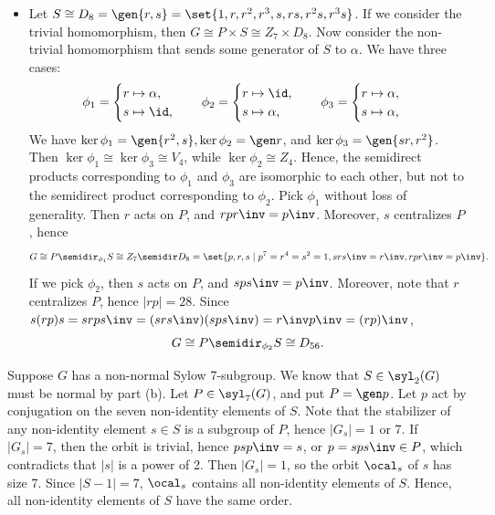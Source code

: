 \begin{solenum}[spsol]
\begin{itemize}
\[        \]
        Note that non-triviality of the homomorphism implies that some $s \in S$ does not centralize $P$.
        If $G$ could be written as a direct product, then $S$ would centralize $P$, which is a contradiction.
        Hence, $G$ is not a direct product.
        \item Let $S \cong D_8 = \gen{r, s} = \set{1, r, r^2, r^3, s, rs, r^2s, r^3s}$.
        If we consider the trivial homomorphism, then $G \cong P \times S \cong Z_7 \times D_8$.
        Now consider the non-trivial homomorphism that sends some generator of $S$ to $\alpha$.
        We have three cases:
        \[
        	\phi_1 = 
            \begin{cases}
                r \mapsto \alpha, \\
                s \mapsto \id,
            \end{cases} \quad
            \phi_2 =
            \begin{cases}
                r \mapsto \id, \\
                s \mapsto \alpha,
            \end{cases} \quad
            \phi_3 =
            \begin{cases}
                r \mapsto \alpha, \\
                s \mapsto \alpha,
            \end{cases}
        \]
        We have $\ker\phi_1 = \gen{r^2, s}, \ker\phi_2 = \gen r$, and $\ker\phi_3 = \gen{sr, r^2}$.
        Then $\ker\phi_1 \cong \ker\phi_3 \cong V_4$, while $\ker\phi_2 \cong Z_4$.
        Hence, the semidirect products corresponding to $\phi_1$ and $\phi_3$ are isomorphic to each other, but not to the semidirect product corresponding to $\phi_2$.
        Pick $\phi_1$ without loss of generality.
        Then $r$ acts on $P$, and $rpr\inv = p\inv$.
        Moreover, $s$ centralizes $P$, hence
        \[
        	G \cong P \semidir_{\phi_1} S \cong Z_7 \semidir D_8 = \set{p, r, s \mid p^7 = r^4 = s^2 = 1, srs\inv = r\inv, rpr\inv = p\inv}.
        \]
        If we pick $\phi_2$, then $s$ acts on $P$, and $sps\inv = p\inv$.
        Moreover, note that $r$ centralizes $P$, hence $|rp| = 28$.
        Since $s(rp)s = srps\inv = (srs\inv)(sps\inv) = r\inv p\inv = (rp)\inv$,
        \[
        	G \cong P \semidir_{\phi_2} S \cong D_{56}.
        \]
    \end{itemize}
    \item Suppose $G$ has a non-normal Sylow 7-subgroup.
	We know that $S \in \syl_2(G)$ must be normal by part (b).
	Let $P \in \syl_7(G)$, and put $P = \gen p$.
	Let $p$ act by conjugation on the seven non-identity elements of $S$.
	Note that the stabilizer of any non-identity element $s \in S$ is a subgroup of $P$, hence $|G_s| = 1$ or 7.
	If $|G_s| = 7$, then the orbit is trivial, hence $psp\inv = s$, or $p = sps\inv \in P$, which contradicts that $|s|$ is a power of 2.
	Then $|G_s| = 1$, so the orbit $\ocal_s$ of $s$ has size 7.
	Since $|S - 1| = 7$, $\ocal_s$ contains all non-identity elements of $S$.
	Hence, all non-identity elements of $S$ have the same order.
    

\end{solenum}
